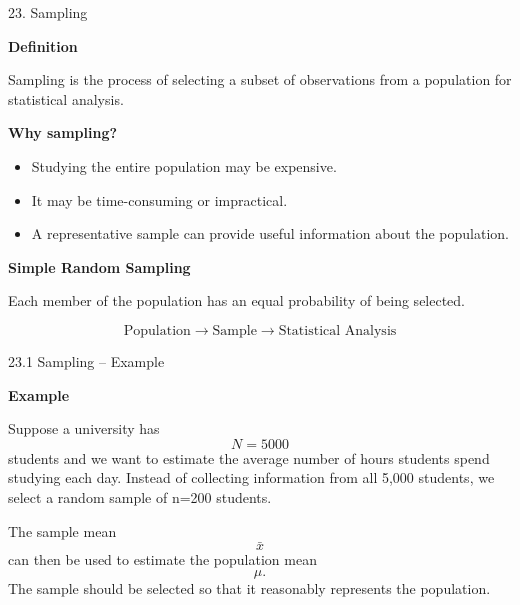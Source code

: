 \begin{frame}{23. Sampling}

\textbf{Definition}

Sampling is the process of selecting a subset of observations
from a population for statistical analysis.

\vspace{0.4cm}

\textbf{Why sampling?}

\begin{itemize}
    \item Studying the entire population may be expensive.
    \item It may be time-consuming or impractical.
    \item A representative sample can provide useful information
    about the population.
\end{itemize}

\vspace{0.3cm}

\textbf{Simple Random Sampling}

Each member of the population has an equal probability
of being selected.

\vspace{0.3cm}

\[
\boxed{
\text{Population}
\longrightarrow
\text{Sample}
\longrightarrow
\text{Statistical Analysis}
}
\]

\end{frame}



\begin{frame}{23.1 Sampling -- Example}

\textbf{Example}

Suppose a university has
\[
N=5000
\]
students and we want to estimate the average number of hours
students spend studying each day. Instead of collecting information from all 5,000 students, we select a random sample of n=200 students.

The sample mean \[
\bar{x}
\] can then be used to estimate the population mean
\[
\mu.
\]
The sample should be selected so that it reasonably represents
the population.

\end{frame}




